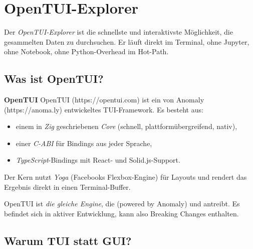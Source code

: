 
\chapter{OpenTUI-Explorer}

\label{ch:tui}

Der \emph{OpenTUI-Explorer} ist die schnellste und interaktivste
Möglichkeit, die gesammelten Daten zu durchsuchen. Er läuft direkt
im Terminal, ohne Jupyter, ohne Notebook, ohne Python-Overhead im
Hot-Path.

\section{Was ist OpenTUI?}

\begin{definition}
\textbf{OpenTUI}
OpenTUI (https://opentui.com) ist ein von Anomaly (https://anoma.ly)
entwickeltes TUI-Framework. Es besteht aus:

\begin{itemize}
  \item einem in \emph{Zig} geschriebenen \emph{Core}
        (schnell, plattformübergreifend, nativ),
  \item einer \emph{C-ABI} für Bindings aus jeder Sprache,
  \item \emph{TypeScript}-Bindings mit React- und Solid.js-Support.
\end{itemize}

Der Kern nutzt \emph{Yoga} (Facebooks Flexbox-Engine) für Layouts
und rendert das Ergebnis direkt in einen Terminal-Buffer.
\end{definition}

\begin{merke}
OpenTUI ist \emph{die gleiche Engine}, die 
(powered by Anomaly) und  antreibt. Es
befindet sich in aktiver Entwicklung, kann also Breaking Changes
enthalten.
\end{merke}

\section{Warum TUI statt GUI?}

